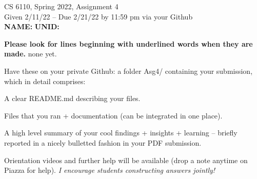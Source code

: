 \documentclass[11pt]{article}
\begin{document}

\newlength{\minpagw}
\settowidth{\minpagw}{\hspace{40em}}

\begin{center}
\begin{large}
  CS 6110, Spring 2022, Assignment 4  \\
  Given 2/11/22 -- Due 2/21/22 by 11:59 pm via your Github 
  \ \\
    {  {\Large\bf NAME: } \hfill {\Large\bf UNID: }\hspace{4cm} }
          \ \\
\end{large}

\end{center}

 {\bf Please look for lines beginning with underlined words when they are made.}
         {\tiny none yet.}

         Have these on your private Github:
         a folder Asg4/ containing your submission, which in detail comprises:
         \begin{compactitem}
         \item A clear README.md describing your files.
         \item Files that you ran + documentation (can be integrated in one place).
         \item A high level summary of your cool findings + insights + learning -- briefly reported in
           a nicely bulletted fashion in your PDF submission.
         \end{compactitem}

Orientation videos and further help will be available (drop a note anytime
on Piazza for help). {\em I encourage students constructing answers jointly!}
\end{document}
